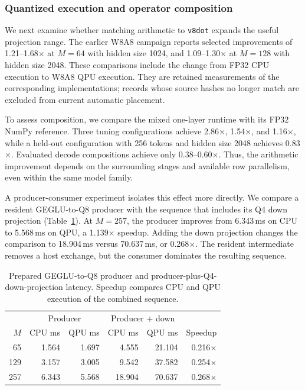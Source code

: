 \documentclass[sigplan,screen,review]{acmart}
\begin{document}
\subsubsection{Quantized execution and operator composition}

We next examine whether matching arithmetic to \texttt{v8dot} expands the useful projection range. The earlier W8A8 campaign reports selected improvements of 1.21--1.68$\times$ at $M=64$ with hidden size 1024, and 1.09--1.30$\times$ at $M=128$ with hidden size 2048. These comparisons include the change from FP32 CPU execution to W8A8 QPU execution. They are retained measurements of the corresponding implementations; records whose source hashes no longer match are excluded from current automatic placement.

To assess composition, we compare the mixed one-layer runtime with its FP32 NumPy reference. Three tuning configurations achieve 2.86$\times$, 1.54$\times$, and 1.16$\times$, while a held-out configuration with 256 tokens and hidden size 2048 achieves 0.83$\times$. Evaluated decode compositions achieve only 0.38--0.60$\times$. Thus, the arithmetic improvement depends on the surrounding stages and available row parallelism, even within the same model family.

A producer-consumer experiment isolates this effect more directly. We compare a resident GEGLU-to-Q8 producer with the sequence that includes its Q4 down projection (Table~\ref{tab:producer-consumer}). At $M=257$, the producer improves from 6.343\,ms on CPU to 5.568\,ms on QPU, a 1.139$\times$ speedup. Adding the down projection changes the comparison to 18.904\,ms versus 70.637\,ms, or 0.268$\times$. The resident intermediate removes a host exchange, but the consumer dominates the resulting sequence.

\begin{table}[t]
\centering
\caption{Prepared GEGLU-to-Q8 producer and producer-plus-Q4-down-projection latency. Speedup compares CPU and QPU execution of the combined sequence.}
\label{tab:producer-consumer}
\small
\begin{tabular}{@{}rrrrrr@{}}
\toprule
& \multicolumn{2}{c}{Producer} &
\multicolumn{2}{c}{Producer + down} & \\
$M$ & CPU ms & QPU ms & CPU ms & QPU ms & Speedup \\
\midrule
65  & 1.564 & 1.697 & 4.555 & 21.104 & 0.216$\times$ \\
129 & 3.157 & 3.005 & 9.542 & 37.582 & 0.254$\times$ \\
257 & 6.343 & 5.568 & 18.904 & 70.637 & 0.268$\times$ \\
\bottomrule
\end{tabular}
\end{table}
\end{document}

